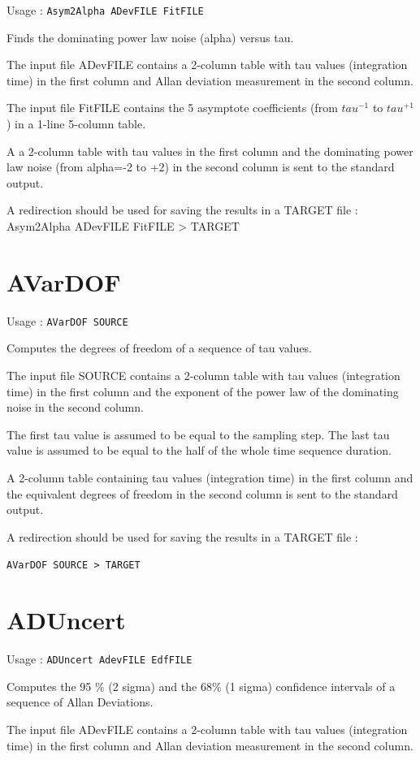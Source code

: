 \documentclass[10pt,a4paper,french]{article}
\begin{document}
Usage : {\tt{Asym2Alpha ADevFILE FitFILE}}

Finds the dominating power law noise (alpha) versus tau.

The input file ADevFILE contains a 2-column table with tau values (integration time) in the first column and Allan deviation measurement in the second column.

The input file FitFILE contains the 5 asymptote coefficients (from $tau^{-1}$ to $tau^{+1}$) in a 1-line 5-column table.

A a 2-column table with tau values in the first column and the dominating power law noise (from alpha=-2 to +2) in the second column is sent to the standard output.

A redirection should be used for saving the results in a TARGET file : Asym2Alpha ADevFILE FitFILE > TARGET

\section{AVarDOF}

Usage : {\tt{AVarDOF SOURCE}}

Computes the degrees of freedom of a sequence of tau values.

The input file SOURCE contains a 2-column table with tau values (integration time) in the first column and the exponent of the power law of the dominating noise in the second column.

The first tau value is assumed to be equal to the sampling step.
The last tau value is assumed to be equal to the half of the whole time sequence duration.

A 2-column table containing tau values (integration time) in the first column and the equivalent degrees of freedom in the second column is sent to the standard output.

A redirection should be used for saving the results in a TARGET file : 

{\tt{AVarDOF SOURCE > TARGET}}

\section{ADUncert}

Usage : {\tt{ADUncert AdevFILE EdfFILE}}

Computes the 95 \% (2 sigma) and the 68\% (1 sigma) confidence intervals of a sequence of Allan Deviations.

The input file ADevFILE contains a 2-column table with tau values (integration time) in the first column and Allan deviation measurement in the second column.
\end{document}
